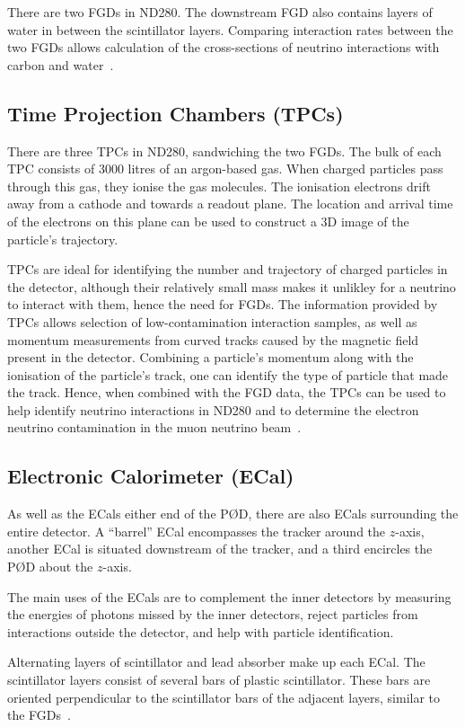 \documentclass[aps,pra,12pt,notitlepage,tightenlines]{revtex4-1}
\begin{document}
There are two FGDs in ND280. The downstream FGD also contains layers of water in between the scintillator layers. Comparing interaction rates between the two FGDs allows calculation of the cross-sections of neutrino interactions with carbon and water~\cite{ABE2011106, Amaudruz:2012agx}.

\subsection{Time Projection Chambers (TPCs)}
There are three TPCs in ND280, sandwiching the two FGDs. The bulk of each TPC consists of 3000 litres of an argon-based gas. When charged particles pass through this gas, they ionise the gas molecules. The ionisation electrons drift away from a cathode and towards a readout plane. The location and arrival time of the electrons on this plane can be used to construct a 3D image of the particle's trajectory.

TPCs are ideal for identifying the number and trajectory of charged particles in the detector, although their relatively small mass makes it unlikley for a neutrino to interact with them, hence the need for FGDs. The information provided by TPCs allows selection of low-contamination interaction samples, as well as momentum measurements from curved tracks caused by the magnetic field present in the detector. Combining a particle's momentum along with the ionisation of the particle's track, one can identify the type of particle that made the track. Hence, when combined with the FGD data, the TPCs can be used to help identify neutrino interactions in ND280 and to determine the electron neutrino contamination in the muon neutrino beam~\cite{ABE2011106, Abgrall:2010hi}.

\subsection{Electronic Calorimeter (ECal)}
As well as the ECals either end of the P\O D, there are also ECals surrounding the entire detector. A ``barrel'' ECal encompasses the tracker around the $z$-axis, another ECal is situated downstream of the tracker, and a third encircles the P\O D about the $z$-axis. 

The main uses of the ECals are to complement the inner detectors by measuring the energies of photons missed by the inner detectors, reject particles from interactions outside the detector, and help with particle identification.

Alternating layers of scintillator and lead absorber make up each ECal. The scintillator layers consist of several bars of plastic scintillator. These bars are oriented perpendicular to the scintillator bars of the adjacent layers, similar to the FGDs~\cite{ABE2011106}.
\end{document}
